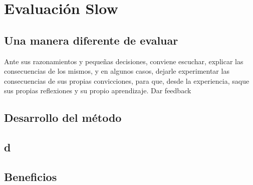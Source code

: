 \chapter{Evaluaci\'on Slow}
\section{Una manera diferente de evaluar}

Ante sus razonamientos y pequeñas decisiones, conviene escuchar, explicar las consecuencias de los mismos, y en algunos casos, dejarle experimentar las 
consecuencias de sus propias convicciones, para que, desde la experiencia, saque sus propias reflexiones y su propio aprendizaje.
Dar feedback
\section{Desarrollo del método}
\section{d}
\section{Beneficios}